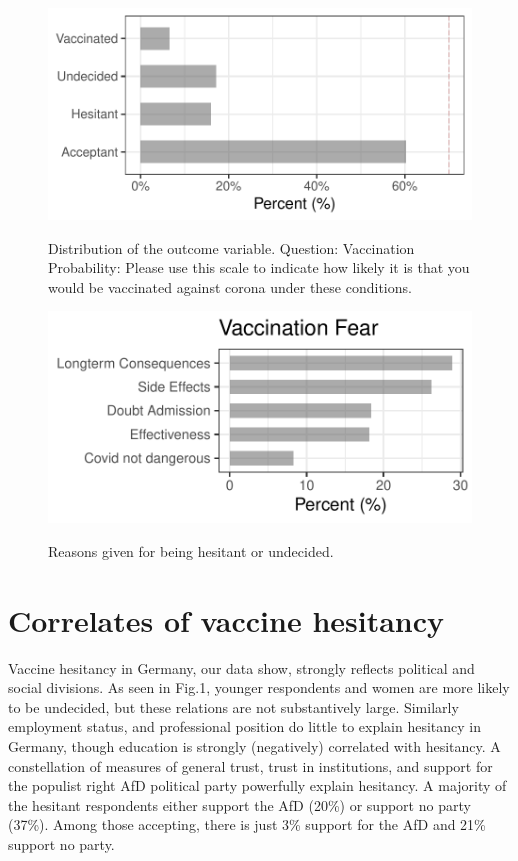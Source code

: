\documentclass[12pt]{article}
\begin{document}
\begin{figure}[h!]
 \centering
 \includegraphics[width=0.8\linewidth]{figures/figure_1.pdf}
 \label{fig:outcomes}
 \caption{Distribution of the outcome variable. Question: Vaccination Probability: Please use this scale to indicate how likely it is that you would be vaccinated against corona under these conditions.}
 \end{figure}
\begin{figure}[h!]
 \centering
 \includegraphics[width=0.8\linewidth]{figures/figure_11.pdf}
 \label{fig:outcomes}
 \caption{Reasons given for being hesitant or undecided.}
 \end{figure}

\clearpage
\section{Correlates of vaccine hesitancy}
Vaccine hesitancy in Germany, our data show, strongly reflects political and social divisions. As seen in Fig.1, younger respondents and women are more likely to be undecided, but these relations are not substantively large. Similarly employment status, and professional position do little to explain hesitancy in Germany, though education is strongly (negatively) correlated with hesitancy. A constellation of measures of general trust, trust in institutions, and support for the populist right AfD political party powerfully explain hesitancy. A majority of the hesitant respondents either support the AfD (20\%) or support no party (37\%). Among those accepting, there is just 3\% support for the AfD and 21\% support no party. 
\end{document}
